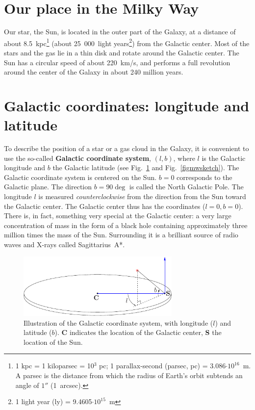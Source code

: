 \vfill\eject
\section{Our place in the Milky Way}
Our star, the Sun, is located in the outer part of the Galaxy, at a distance of
about 8.5~kpc\footnote{1 kpc = 1 kiloparsec = 10$^3$ pc; 1 parallax-second
(parsec, pc) = 3.086$\cdot 10^{16}$~m.  A parsec is the distance from which the
radius of Earth's orbit subtends an angle of $1''$ (1~arcsec).} (about
25~000~light years\footnote{1 light year (ly) = 9.4605$\cdot 10^{15}$~m}) from
the Galactic center.  Most of the stars and the gas lie in a thin disk and
rotate around the Galactic center.  The Sun has a circular speed of about
220~km/s, and performs a full revolution around the center of the Galaxy in
about 240 million years.

\section{Galactic coordinates: longitude and latitude}
\label{sect:galcoords}
To describe the position of a star or a gas cloud in the Galaxy, it is
convenient to use the so-called {\bf Galactic coordinate system}, $(l,b)$,
where $l$ is the Galactic longitude and $b$ the Galactic latitude (see
Fig.~\ref{figdisc} and Fig.~\ref{figmwsketch}).  The Galactic coordinate system
is centered on the Sun.  $b=0$ corresponds to the Galactic plane. The direction
$b=90\deg$ is called the North Galactic Pole. The longitude $l$ is measured
{\it counterclockwise} from the direction from the Sun toward the Galactic
center.  The Galactic center thus has the coordinates ($l=0,b=0$).  There is,
in fact, something very special at the Galactic center: a very large
concentration of mass in the form of a black hole containing approximately
three million times the mass of the Sun.  Surrounding it is a brilliant source
of radio waves and X-rays called Sagittarius~A*. 


\begin{figure}[ht]
\begin{center}
\includegraphics[width=8cm]{../figures/galdisc.pdf}
\end{center}
\caption{Illustration of the Galactic coordinate system, with longitude ($l$) and latitude ($b$). 
{\bf C} indicates the location of the Galactic center, {\bf S} the location of the Sun.}
\label{figdisc}
\end{figure} 

